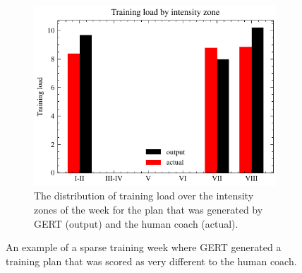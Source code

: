 \begin{figure}[ht]
    \begin{subfigure}[t]{0.7\textwidth}
        \centering
        \includegraphics[width=\textwidth]{chapters/figures/result_examples/worst_zone.pdf}
        \captionsetup{width=.9\linewidth}
        \caption{The distribution of training load over the intensity zones of the week for the plan that was generated by GERT (output) and the human coach (actual).}
    \end{subfigure}
    \caption{An example of a sparse training week where GERT generated a training plan that was scored as very different to the human coach.}
\end{figure}
